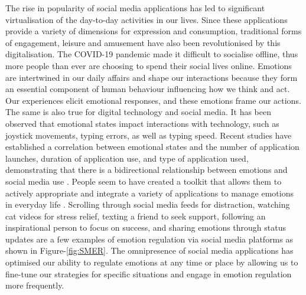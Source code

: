 \documentclass[lettersize,journal]{IEEEtran}
\begin{document}
The rise in popularity of social media applications has led to significant virtualisation of the day-to-day activities in our lives. Since these applications provide a variety of dimensions for expression and consumption, traditional forms of engagement, leisure and amusement have also been revolutionised by this digitalisation. The COVID-19 pandemic made it difficult to socialise offline, thus more people than ever are choosing to spend their social lives online. Emotions are intertwined in our daily affairs and shape our interactions because they form an essential component of human behaviour influencing how we think and act. Our experiences elicit emotional responses, and these emotions frame our actions. The same is also true for digital technology and social media. It has been observed that emotional states impact interactions with technology, such as joystick movements, typing errors, as well as typing speed. Recent studies have established a correlation between emotional states and the number of application launches, duration of application use, and type of application used, demonstrating that there is a bidirectional relationship between emotions and social media use \cite{sarsenbayeva2020does}. People seem to have created a toolkit that allows them to actively appropriate and integrate a variety of applications to manage emotions in everyday life \cite{smith2022digital}. Scrolling through social media feeds for distraction, watching cat videos for stress relief, texting a friend to seek support, following an inspirational person to focus on success, and sharing emotions through status updates are a few examples of emotion regulation via social media platforms as shown in Figure-\ref{fig:SMER}. The omnipresence of social media applications has optimised our ability to regulate emotions at any time or place by allowing us to fine-tune our strategies for specific situations and engage in emotion regulation more frequently.
\end{document}
